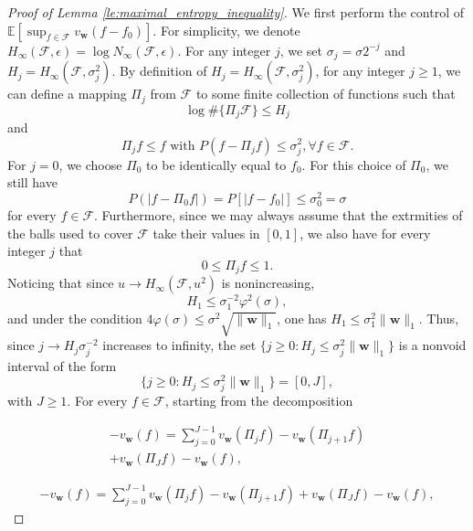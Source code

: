 \documentclass[letterpaper]{article} %
\def\DoubleColumn{}
\def\DoubleColumnEnd{}
\def\SingleColumn{}
\newcommand{\E}{\mathbb{E}}
\newcommand{\weight}{\mathbf{w}}
\newcommand{\normo}[1]{\|#1\|_1}
\begin{document}
\begin{proof}[Proof of Lemma \ref{le:maximal_entropy_inequality}] %
    We first perform the control of $\E[\sup_{f\in\mathcal{F}}v_\weight(f-f_0)]$. For simplicity, we denote $H_\infty(\mathcal{F}, \epsilon)=\log N_\infty(\mathcal{F},\epsilon)$. For any integer $j$, we set $\sigma_j=\sigma2^{-j}$ and $H_j=H_\infty(\mathcal{F},\sigma_j^2)$. By definition of $H_j=H_\infty(\mathcal{F},\sigma_j^2)$, for any integer $j\ge 1$, we can define a mapping $\Pi_j$ from $\mathcal{F}$ to some finite collection of functions such that
    \begin{equation}
        \label{eq:bounded_entropy_mapping}
        \log \#\{\Pi_j\mathcal{F}\}\le H_j
    \end{equation}
    and
    \begin{equation}
        \label{eq:bounded_entropy_condition}
        \Pi_jf\le f \text{ with }P(f-\Pi_jf)\le \sigma_j^2, \forall f\in\mathcal{F}.
    \end{equation}
    For $j=0$, we choose $\Pi_0$ to be identically equal to $f_0$. For this choice of $\Pi_0$, we still have
    \begin{equation}
        \label{eq:bounded_entropy_f0}
        P(|f-\Pi_0f|)=P[|f-f_0|]\le \sigma_0^2=\sigma
    \end{equation}
    for every $f\in\mathcal{F}$. Furthermore, since we may always assume that the extrmities of the balls used to cover $\mathcal{F}$ take their values in $[0,1]$, we also have for every integer $j$ that
    \[0\le\Pi_jf\le1.\]
    Noticing that since $u\to H_\infty(\mathcal{F},u^2)$ is nonincreasing,
    \[H_1\le \sigma_1^{-2}\varphi^2(\sigma),\]
    and under the condition $4\varphi(\sigma)\le \sigma^2\sqrt{\normo{\weight{}}}$, one has $H_1\le \sigma_1^2\normo{\weight{}}$. Thus, since $j\to H_j\sigma_j^{-2}$ increases to infinity, the set $\{j\ge 0: H_j\le \sigma_j^2\normo{\weight{}}\}$ is a nonvoid interval of the form
    \[\{j\ge 0: H_j\le \sigma_j^2\normo{\weight{}}\}=[0,J],\]
    with $J\ge 1$. For every $f\in\mathcal{F}$, starting from the decomposition
    \DoubleColumn
    \begin{align*}
    -v_\weight(f)=\sum_{j=0}^{J-1}v_\weight(\Pi_jf)-v_\weight(\Pi_{j+1}f)\\
    +v_\weight(\Pi_Jf)-v_\weight(f),
    \end{align*}
    \DoubleColumnEnd
    \SingleColumn
    \begin{align*}
    -v_\weight(f)=\sum_{j=0}^{J-1}v_\weight(\Pi_jf)-v_\weight(\Pi_{j+1}f)+v_\weight(\Pi_Jf)-v_\weight(f),

\end{align*}
\end{proof}
\end{document}
